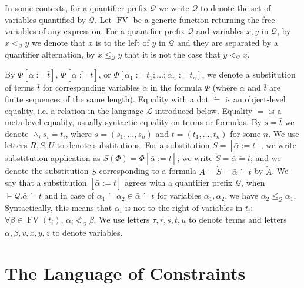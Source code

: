 \documentclass{article}
\newcommand{\assign}{:=}
\newcommand{\tmop}[1]{\ensuremath{\operatorname{#1}}}
\begin{document}
In some contexts, for a quantifier prefix $\mathcal{Q}$ we write $\mathcal{Q}$
to denote the set of variables quantified by $\mathcal{Q}$. Let $\tmop{FV}$ be
a generic function returning the free variables of any expression. For a
quantifier prefix $\mathcal{Q}$ and variables $x, y$ in $\mathcal{Q}$, by $x
<_{\mathcal{Q}} y$ we denote that $x$ is to the left of $y$ in $\mathcal{Q}$
and they are separated by a quantifier alternation, by $x
\leqslant_{\mathcal{Q}} y$ that it is not the case that $y <_{\mathcal{Q}} x$.

By $\Phi [\bar{\alpha} \assign \bar{t}]$, $\Phi [\overline{\alpha \assign
t}]$, or $\Phi [\alpha_1 \assign t_1 ; \ldots ; \alpha_n \assign t_n]$, we
denote a substitution of terms $\bar{t}$ for corresponding variables
$\bar{\alpha}$ in the formula $\Phi$ (where $\bar{\alpha}$ and $\bar{t}$ are
finite sequences of the same length). Equality with a dot $\dot{=}$ is an
object-level equality, i.e. a relation in the language $\mathcal{L}$
introduced below. Equality $=$ is a meta-level equality, usually syntactic
equality on terms or formulas. By $\bar{s} \dot{=} \bar{t}$ we denote
$\wedge_i s_i \dot{=} t_i$, where $\bar{s} = (s_1, \ldots, s_n)$ and $\bar{t}
= (t_1, \ldots, t_n)$ for some $n$. We use letters $R, S, U$ to denote
substitutions. For a substitution $S = [\bar{\alpha} \assign \bar{t}]$, we
write substitution application as $S (\Phi) = \Phi [\bar{\alpha} \assign
\bar{t}]$; we write $\dot{S} = \bar{\alpha} \dot{=} \bar{t}$; and we denote
the substitution $S$ corresponding to a formula $A = \dot{S} = \bar{\alpha}
\dot{=} \bar{t}$ by $\tilde{A}$. We say that a substitution $[\bar{\alpha}
\assign \bar{t}]$ agrees with a quantifier prefix $\mathcal{Q}$, when $\vDash
\mathcal{Q}. \bar{\alpha} \dot{=} \bar{t}$ and in case of $\alpha_1 \dot{=}
\alpha_2 \in \bar{\alpha} \dot{=} \bar{t}$ for variables $\alpha_1, \alpha_2$,
we have $\alpha_2 \leqslant_{\mathcal{Q}} \alpha_1$. Syntactically, this means
that $\alpha_i$ is not to the right of variables in $t_i$: $\forall \beta \in
\tmop{FV} (t_i)$, $\alpha_i \nless_{\mathcal{Q}} \beta$. We use letters $\tau,
r, s, t, u$ to denote terms and letters $\alpha, \beta, v, x, y, z$ to denote
variables.

\section{The Language of Constraints}
\end{document}
